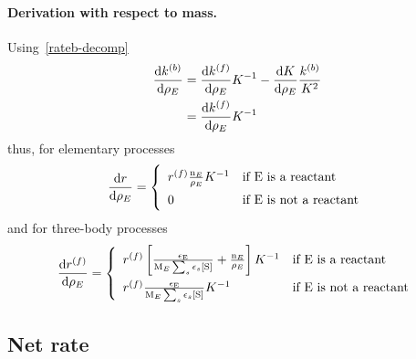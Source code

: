 \paragraph{Derivation with respect to mass.}
Using~\ref{rateb-decomp}
\begin{equation}
\begin{split}
\doverdm[E]{\bkwdratecons} &= \doverdm[E]{\fwdratecons}\Eqconst^{-1} - \doverdm[E]{\Eqconst}\frac{\bkwdratecons}{\Eqconst^{2}} \\
                        &= \doverdm[E]{\fwdratecons}\Eqconst^{-1}
\end{split}
\label{rateb-decomp-m}
\end{equation}
thus, for elementary processes
\begin{equation}
\doverdm[E]{\rate} = \left\{\begin{array}{ll}
                        \fwdrate \frac{\scoefabs[E]}{\mass[E]} \Eqconst^{-1} & \text{if \ce{E} is a reactant} \\
                        0                                                  & \text{if \ce{E} is not a reactant} \\
                      \end{array}\right.
\end{equation}
and for three-body processes
\begin{equation}
\renewcommand{\arraystretch}{1.5}
\doverdm[E]{\fwdrate} = \left\{\begin{array}{ll}
                        \fwdrate \left[\frac{\epsilon_{\ce{E}}}{\Mm[E]\threeBody} + \frac{\scoefabs[E]}{\mass[E]} \right] \Eqconst^{-1}
                                                & \text{if \ce{E} is a reactant} \\
                        \fwdrate \frac{\epsilon_{\ce{E}}}{\Mm[E]\threeBody} \Eqconst^{-1}
                                                & \text{if \ce{E} is not a reactant} \\
                      \end{array}\right.
\end{equation}

\subsection{Net rate}

